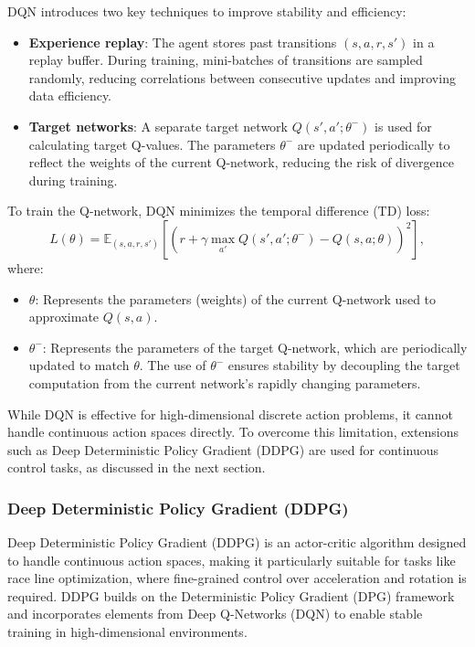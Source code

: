 \documentclass{article}
\begin{document}
DQN introduces two key techniques to improve stability and efficiency:
\begin{itemize}
    \item \textbf{Experience replay}: The agent stores past transitions \((s, a, r, s')\) in a replay buffer. During training, mini-batches of transitions are sampled randomly, reducing correlations between consecutive updates and improving data efficiency.
    \item \textbf{Target networks}: A separate target network \(Q(s', a'; \theta^-)\) is used for calculating target Q-values. The parameters \(\theta^-\) are updated periodically to reflect the weights of the current Q-network, reducing the risk of divergence during training.
\end{itemize}

To train the Q-network, DQN minimizes the temporal difference (TD) loss:
\[
L(\theta) = \mathbb{E}_{(s, a, r, s')} \left[ \left( r + \gamma \max_{a'} Q(s', a'; \theta^-) - Q(s, a; \theta) \right)^2 \right],
\]
where:
\begin{itemize}
    \item \(\theta\): Represents the parameters (weights) of the current Q-network used to approximate \(Q(s, a)\).
    \item \(\theta^-\): Represents the parameters of the target Q-network, which are periodically updated to match \(\theta\). The use of \(\theta^-\) ensures stability by decoupling the target computation from the current network’s rapidly changing parameters.
\end{itemize}

While DQN is effective for high-dimensional discrete action problems, it cannot handle continuous action spaces directly. To overcome this limitation, extensions such as Deep Deterministic Policy Gradient (DDPG) are used for continuous control tasks, as discussed in the next section.

\subsubsection{Deep Deterministic Policy Gradient (DDPG)}

Deep Deterministic Policy Gradient (DDPG) is an actor-critic algorithm designed to handle continuous action spaces, making it particularly suitable for tasks like race line optimization, where fine-grained control over acceleration and rotation is required. DDPG builds on the Deterministic Policy Gradient (DPG) framework and incorporates elements from Deep Q-Networks (DQN) to enable stable training in high-dimensional environments.
\end{document}
